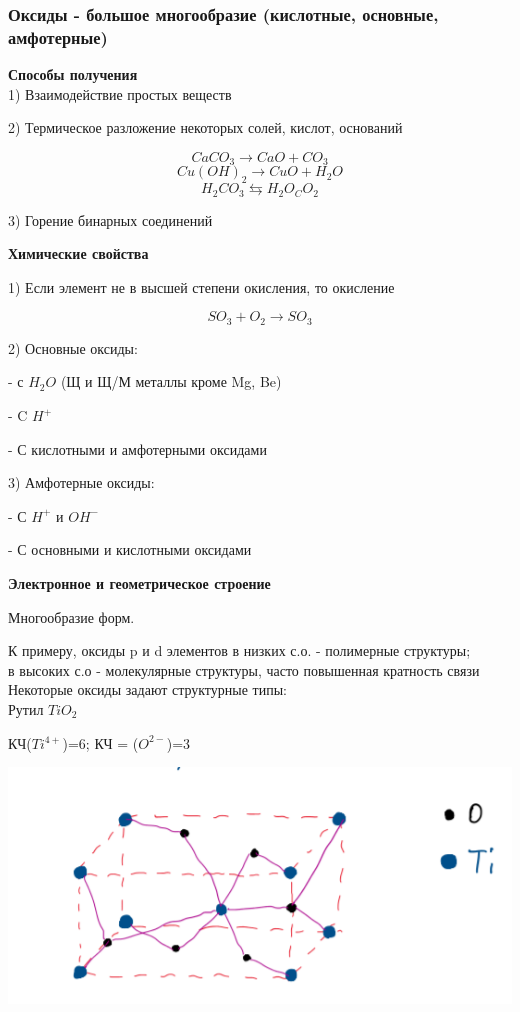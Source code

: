 \documentclass[14pt,a4paper]{scrartcl}
\begin{document}
\subsubsection{Оксиды - большое многообразие (кислотные, основные, амфотерные)}

\textbf{Способы получения}\\
1) Взаимодействие простых веществ

2) Термическое разложение некоторых солей, кислот, оснований

$$CaCO_3 \rightarrow CaO + CO_3$$
$$Cu(OH)_2 \rightarrow CuO + H_2O$$
$$H_2CO_3 \leftrightarrows H_2O _ CO_2$$

3) Горение бинарных соединений

\textbf{Химические свойства}

1) Если элемент не в высшей степени окисления, то окисление

$$SO_3 + O_2 \rightarrow SO_3$$

2) Основные оксиды:

- с $H_2O$ (Щ и Щ/М металлы кроме Mg, Be)

- C $H^+$

- С кислотными и амфотерными оксидами

3) Амфотерные оксиды:

- С $H^+$ и $OH^-$

- С основными и кислотными оксидами

\textbf{Электронное и геометрическое строение}

Многообразие форм.

К примеру, оксиды p и d элементов в низких с.о. - полимерные структуры;\\
в высоких с.о - молекулярные структуры, часто повышенная кратность связи\\
Некоторые оксиды задают структурные типы:\\
Рутил $TiO_2$

КЧ($Ti^{4+}$)=6; КЧ = ($O^{2-}$)=3

\includegraphics{6v6.png}
\end{document}
